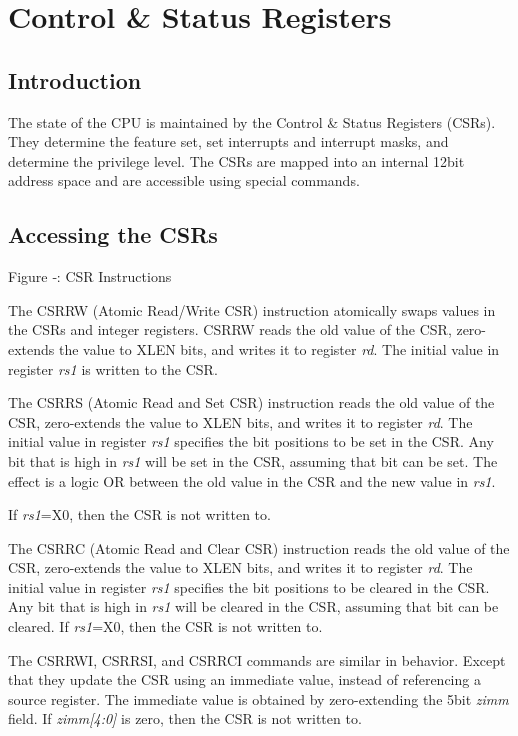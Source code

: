 \chapter{Control \& Status Registers}\label{control-status-registers}

\section{Introduction}\label{introduction-3}

The state of the CPU is maintained by the Control \& Status Registers
(CSRs). They determine the feature set, set interrupts and interrupt
masks, and determine the privilege level. The CSRs are mapped into an
internal 12bit address space and are accessible using special commands.

\section{Accessing the CSRs}\label{accessing-the-csrs}

\missingfigure{}

Figure ‑: CSR Instructions

The CSRRW (Atomic Read/Write CSR) instruction atomically swaps values in
the CSRs and integer registers. CSRRW reads the old value of the CSR,
zero-extends the value to XLEN bits, and writes it to register
\emph{rd}. The initial value in register \emph{rs1} is written to the
CSR.

The CSRRS (Atomic Read and Set CSR) instruction reads the old value of
the CSR, zero-extends the value to XLEN bits, and writes it to register
\emph{rd}. The initial value in register \emph{rs1} specifies the bit
positions to be set in the CSR. Any bit that is high in \emph{rs1} will
be set in the CSR, assuming that bit can be set. The effect is a logic
OR between the old value in the CSR and the new value in \emph{rs1}.

If \emph{rs1}=X0, then the CSR is not written to.

The CSRRC (Atomic Read and Clear CSR) instruction reads the old value of
the CSR, zero-extends the value to XLEN bits, and writes it to register
\emph{rd}. The initial value in register \emph{rs1} specifies the bit
positions to be cleared in the CSR. Any bit that is high in \emph{rs1}
will be cleared in the CSR, assuming that bit can be cleared. If
\emph{rs1}=X0, then the CSR is not written to.

The CSRRWI, CSRRSI, and CSRRCI commands are similar in behavior. Except
that they update the CSR using an immediate value, instead of
referencing a source register. The immediate value is obtained by
zero-extending the 5bit \emph{zimm} field. If \emph{zimm{[}4:0{]}} is
zero, then the CSR is not written to.

